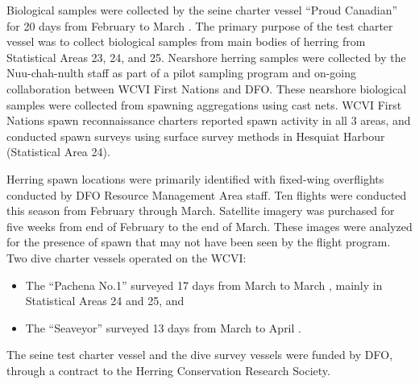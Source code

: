 Biological samples were collected by the seine charter vessel ``Proud Canadian'' for 20 days from February  to March .
The primary purpose of the test charter vessel was to collect biological samples from main bodies of herring from Statistical Areas 23, 24, and 25.
Nearshore herring samples were collected by the Nuu-chah-nulth staff as part of a pilot sampling program and on-going collaboration between WCVI First Nations and DFO.
These nearshore biological samples were collected from spawning aggregations using cast nets.
WCVI First Nations spawn reconnaissance charters reported spawn activity in all 3 areas, and conducted spawn surveys using surface survey methods in Hesquiat Harbour (Statistical Area 24).

Herring spawn locations were primarily identified with fixed-wing overflights conducted by DFO Resource Management Area staff.
Ten flights were conducted this season from February through March.
Satellite imagery was purchased for five weeks from end of February to the end of March.
These images were analyzed for the presence of spawn that may not have been seen by the flight program. 
Two dive charter vessels operated on the WCVI:
\begin{itemize}
\item The ``Pachena No.1'' surveyed 17 days from March  to March , mainly in Statistical Areas 24 and 25, and
\item The ``Seaveyor'' surveyed 13 days from March  to April .
\end{itemize}
The seine test charter vessel and the dive survey vessels were funded by DFO, through a contract to the Herring Conservation Research Society.